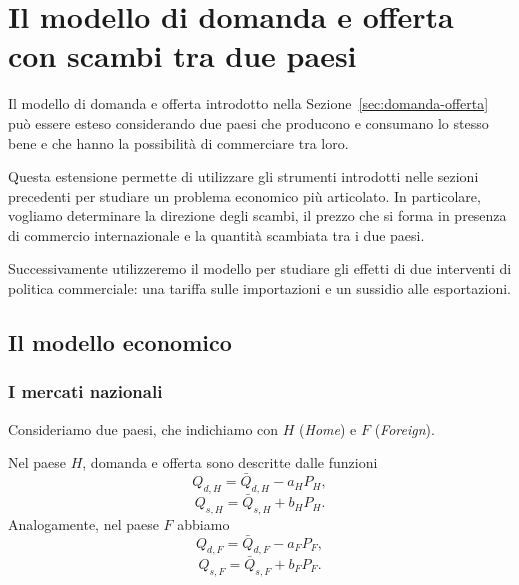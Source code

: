 \section{\textbf{Il modello di domanda e offerta con scambi tra due paesi}}
\label{sec:commercio-due-paesi}

Il modello di domanda e offerta introdotto nella
Sezione~\ref{sec:domanda-offerta} può essere esteso considerando
due paesi che producono e consumano lo stesso bene e che hanno
la possibilità di commerciare tra loro.

Questa estensione permette di utilizzare gli strumenti introdotti
nelle sezioni precedenti per studiare un problema economico più
articolato. In particolare, vogliamo determinare la direzione degli
scambi, il prezzo che si forma in presenza di commercio
internazionale e la quantità scambiata tra i due paesi.

Successivamente utilizzeremo il modello per studiare gli effetti
di due interventi di politica commerciale: una tariffa sulle
importazioni e un sussidio alle esportazioni.

\subsection{Il modello economico}

\subsubsection{I mercati nazionali}

Consideriamo due paesi, che indichiamo con $H$ (\emph{Home}) e
$F$ (\emph{Foreign}).

Nel paese $H$, domanda e offerta sono descritte dalle funzioni
\begin{equation*}
    Q_{d,H} = \bar{Q}_{d,H} - a_H P_H,
    \label{eq:domanda-H}
\end{equation*}
\begin{equation*}
    Q_{s,H} = \bar{Q}_{s,H} + b_H P_H.
    \label{eq:offerta-H}
\end{equation*}
Analogamente, nel paese $F$ abbiamo
\begin{equation*}
    Q_{d,F} = \bar{Q}_{d,F} - a_F P_F,
    \label{eq:domanda-F}
\end{equation*}
\begin{equation*}
    Q_{s,F} = \bar{Q}_{s,F} + b_F P_F.
    \label{eq:offerta-F}
\end{equation*}


